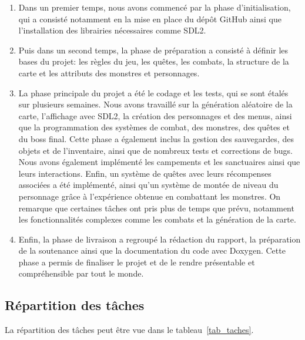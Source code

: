 \documentclass[11pt,a4paper]{article}
\begin{document}
\begin{enumerate} 
	\item Dans un premier temps, nous avons commencé par la phase d'initialisation, qui a consisté notamment en la mise en place du dépôt GitHub ainsi que l'installation des librairies nécessaires comme SDL2. 
	\item Puis dans un second temps, la phase de préparation a consisté à définir les bases du projet: les règles du jeu, les quêtes, les combats, la structure de la carte et les attributs des monstres et personnages. 
	\item La phase principale du projet a été le codage et les tests, qui se sont étalés sur plusieurs semaines. Nous avons travaillé sur la génération aléatoire de la carte, l'affichage avec SDL2, la création des personnages et des menus, ainsi que la programmation des systèmes de combat, des monstres, des quêtes et du boss final. Cette phase a également inclus la gestion des sauvegardes, des objets et de l'inventaire, ainsi que de nombreux tests et corrections de bugs. Nous avons également implémenté les campements et les sanctuaires ainsi que leurs interactions. Enfin, un système de quêtes avec leurs récompenses associées a été implémenté, ainsi qu'un système de montée de niveau du personnage grâce à l'expérience obtenue en combattant les monstres. On remarque que certaines tâches ont pris plus de temps que prévu, notamment les fonctionnalités complexes comme les combats et la génération de la carte. 
	\item Enfin, la phase de livraison a regroupé la rédaction du rapport, la préparation de la soutenance ainsi que la documentation du code avec Doxygen. Cette phase a permis de finaliser le projet et de le rendre présentable et compréhensible par tout le monde. 
\end{enumerate}

\subsection{Répartition des tâches}

La répartition des tâches peut être vue dans le tableau~\ref{tab_taches}.
\end{document}
